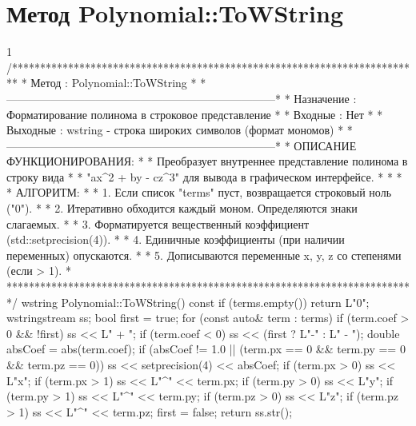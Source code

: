 \section{Метод Polynomial::ToWString}
\footnotesize
\begin{listing}{1}
/*************************************************************************
* Метод         : Polynomial::ToWString                                  *
*------------------------------------------------------------------------*
* Назначение    : Форматирование полинома в строковое представление      *
* Входные       : Нет                                                    *
* Выходные      : wstring - строка широких символов (формат мономов)     *
*------------------------------------------------------------------------*
* ОПИСАНИЕ ФУНКЦИОНИРОВАНИЯ:                                             *
* Преобразует внутреннее представление полинома в строку вида            *
* "ax^2 + by - cz^3" для вывода в графическом интерфейсе.                *
* *
* АЛГОРИТМ:                                                              *
* 1. Если список "terms" пуст, возвращается строковый ноль ("0").         *
* 2. Итеративно обходится каждый моном. Определяются знаки слагаемых.    *
* 3. Форматируется вещественный коэффициент (std::setprecision(4)).      *
* 4. Единичные коэффициенты (при наличии переменных) опускаются.         *
* 5. Дописываются переменные x, y, z со степенями (если > 1).            *
*************************************************************************/
wstring Polynomial::ToWString() const {
    if (terms.empty()) return L"0";
    wstringstream ss; bool first = true;
    for (const auto& term : terms) {
        if (term.coef > 0 && !first) ss << L" + ";
        if (term.coef < 0) ss << (first ? L"-" : L" - ");
        double absCoef = abs(term.coef);
        if (absCoef != 1.0 || (term.px == 0 && term.py == 0 && 
            term.pz == 0)) ss << setprecision(4) << absCoef;   
        if (term.px > 0) { ss << L"x"; if (term.px > 1) ss << L"^" << term.px; }
        if (term.py > 0) { ss << L"y"; if (term.py > 1) ss << L"^" << term.py; }
        if (term.pz > 0) { ss << L"z"; if (term.pz > 1) ss << L"^" << term.pz; }
        first = false;
    }
    return ss.str();
}
\end{listing}
\normalsize

\pagebreak

